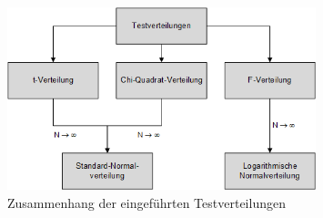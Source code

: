 \noindent 
\begin{figure}[H]
  \centerline{\includegraphics[width=0.8\textwidth]{Kapitel4/Bilder/image47}}
  \caption{Zusammenhang der eingef\"{u}hrten Testverteilungen}
  \label{fig:UebersichtTestverteilungen}
\end{figure}

\clearpage

